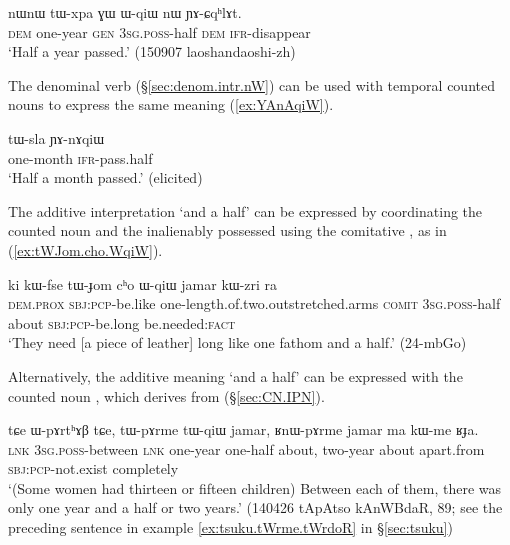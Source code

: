\begin{exe}
\ex \label{ex:tWxpa.WqiW}
\gll nɯnɯ tɯ-xpa ɣɯ ɯ-qiɯ nɯ ɲɤ-ɕqʰlɤt. \\
\textsc{dem} one-year \textsc{gen} \textsc{3sg}.\textsc{poss}-half \textsc{dem} \textsc{ifr}-disappear \\
\glt  `Half a year passed.' (150907 laoshandaoshi-zh)
\end{exe}

The denominal verb  (§\ref{sec:denom.intr.nW}) can be used with temporal counted nouns to express the same meaning (\ref{ex:YAnAqiW}).

\begin{exe}
	\ex \label{ex:YAnAqiW}
	\gll tɯ-sla ɲɤ-nɤqiɯ \\
	one-month \textsc{ifr}-pass.half \\
	\glt `Half a month passed.' (elicited)
\end{exe}

The additive interpretation  `and a half' can be expressed by coordinating the counted noun and the inalienably possessed  using the comitative , as in (\ref{ex:tWJom.cho.WqiW}).

\begin{exe}
\ex \label{ex:tWJom.cho.WqiW}
\gll ki kɯ-fse tɯ-ɟom cʰo ɯ-qiɯ jamar kɯ-zri ra \\
 \textsc{dem}.\textsc{prox} \textsc{sbj}:\textsc{pcp}-be.like one-length.of.two.outstretched.arms \textsc{comit} \textsc{3sg}.\textsc{poss}-half about \textsc{sbj}:\textsc{pcp}-be.long be.needed:\textsc{fact} \\
\glt `They need [a piece of leather] long like one fathom and a half.' (24-mbGo) 
\end{exe}

Alternatively, the additive meaning `and a half' can be expressed with the counted noun , which derives from   (§\ref{sec:CN.IPN}). 

\begin{exe}
\ex \label{ex:tWqiW}
\gll tɕe ɯ-pɤrtʰɤβ tɕe, tɯ-pɤrme tɯ-qiɯ jamar, ʁnɯ-pɤrme jamar ma kɯ-me ʁɟa. \\
 \textsc{lnk} \textsc{3sg}.\textsc{poss}-between \textsc{lnk} one-year one-half about, two-year about apart.from \textsc{sbj}:\textsc{pcp}-not.exist completely  \\
\glt  `(Some women had thirteen or fifteen children) Between each of them, there was only one year and a half or two years.' (140426 tApAtso kAnWBdaR, 89; see the preceding sentence in example \ref{ex:tsuku.tWrme.tWrdoR} in §\ref{sec:tsuku})
\end{exe}

